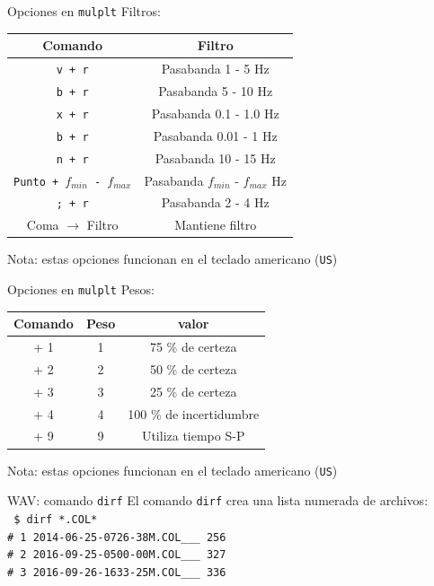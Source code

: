 \documentclass[11pt]{beamer}
\begin{document}
\begin{frame}{Opciones en {\tt mulplt}}
Filtros:\\
\begin{table}
\begin{tabular}{|c|c|}
\hline
{\bf Comando} & {\bf Filtro} \\
\hline
{\tt v + r} & Pasabanda 1 - 5 Hz \\ 
\hline 
{\tt b + r} & Pasabanda 5 - 10 Hz \\ 
\hline 
{\tt x + r} & Pasabanda 0.1 - 1.0 Hz \\ 
\hline 
{\tt b + r} & Pasabanda 0.01 - 1 Hz \\ 
\hline 
{\tt n + r} & Pasabanda 10 - 15 Hz \\  
\hline 
{\tt Punto + $f_{min}$ - $f_{max}$} & Pasabanda $f_{min}$ - $f_{max}$ Hz \\  
\hline
{\tt ; + r} & Pasabanda 2 - 4 Hz \\  
\hline
Coma $\rightarrow$ Filtro & Mantiene filtro \\  
\hline
\end{tabular} 
\end{table}
{\scriptsize Nota: estas opciones funcionan en el teclado americano ({\tt US})}
\end{frame}

\begin{frame}{Opciones en {\tt mulplt}}
Pesos:\\
\begin{table}
\begin{tabular}{|c|c|c|}
\hline 
 {\bf Comando} & {\bf Peso} & {\bf valor} \\ 
\hline 
\keys{\shift} + 1 & 1 & 75 \% de certeza  \\ 
\hline 
\keys{\shift} + 2 & 2 & 50 \% de certeza \\ 
\hline 
\keys{\shift} + 3 & 3 & 25 \% de certeza \\ 
\hline 
\keys{\shift} + 4 & 4 & 100 \% de incertidumbre \\ 
\hline
\keys{\shift} + 9 & 9 & Utiliza tiempo S-P \\ 
\hline  
\end{tabular} 
\end{table}
{\scriptsize Nota: estas opciones funcionan en el teclado americano ({\tt US})}
\end{frame}


\begin{frame}{WAV: comando {\tt dirf}}
El comando {\tt dirf} crea una lista numerada de archivos:\\
{\small \tt 
 \$ dirf *.COL*\\
 \#  1  2014-06-25-0726-38M.COL\_\_\_ 256 \\                                        
 \#  2  2016-09-25-0500-00M.COL\_\_\_ 327 \\                                        
 \#  3  2016-09-26-1633-25M.COL\_\_\_ 336 \\
}
\end{frame}
\end{document}
